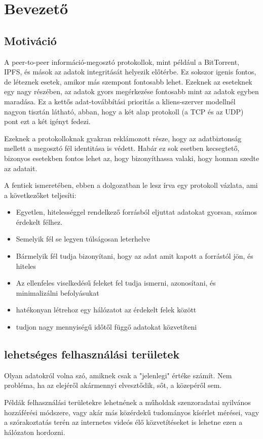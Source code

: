 \chapter{Bevezet\H{o}}\label{ch:BEV}

\section{Motiváció}\label{sec:BEV:mot}

A peer-to-peer információ-megosztó protokollok,
mint például a BitTorrent, IPFS, és mások az
adatok integritását helyezik el\H{o}térbe. Ez
sokszor igenis fontos, de léteznek esetek,
amikor más szempont fontosabb lehet. Ezeknek az
eseteknek egy nagy részében, az adatok gyors
megérkezése fontosabb mint az adatok egyben
maradása. Ez a kett\H{o}s adat-továbbítási
prioritás a kliens-szerver modellnél nagyon
tisztán látható, abban, hogy a két alap
protokoll (a TCP és az UDP) pont ezt a két
igényt fedezi.

Ezeknek a protokolloknak gyakran reklámozott
része, hogy az adatbiztonság mellett a megosztó
fél identitása is védett. Habár ez sok esetben
kecsegtet\H{o}, bizonyos esetekben fontos lehet az,
hogy bizonyíthassa valaki, hogy honnan szedte az
adatait.

A fentiek ismeretében, ebben a dolgozatban le
lesz írva egy protokoll vázlata, ami a
következ\H{o}ket teljesíti:
\begin{itemize}
\item Egyetlen, hitelességgel rendelkez\H{o}
forrásból eljuttat adatokat gyorsan, számos
érdekelt félhez.
\item Semelyik fél se legyen túlságosan
leterhelve
\item Bármelyik fél tudja bizonyítani, hogy az
adat amit kapott a forrástól jön, és hiteles
\item Az ellenfeles viselkedés\H{u} feleket fel
tudja ismerni, azonosítani, és minimalizálni
befolyásukat
\item hatékonyan létrehoz egy hálózatot az
érdekelt felek között
\item tudjon nagy mennyiségű időtől függő adatokat közvetíteni
\end{itemize}


\section{lehetséges felhasználási területek}

Olyan adatokról volna szó, amiknek csak a "jelenlegi" értéke számít. Nem
probléma, ha az elejéről akármennyi elvesztődik, sőt, a közepéről sem.

Példák felhasználási területekre lehetnének a műholdak szenzoradatai
nyilvános hozzáférési módszere, vagy akár más közérdekű tudományos
kísérlet mérései, vagy a szórakoztatás terén az internetes videós
élő közvetítéseket is lehetne ezen a hálózaton hordozni.
